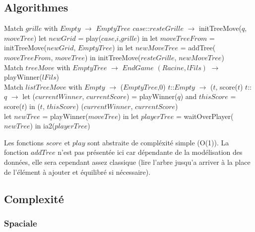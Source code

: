 \documentclass[a4paper,12pt]{report}
\begin{document}
\subsection{Algorithmes}

\begin{algorithmic}
	\State Match $grille$ with
	\State $Empty$ $\rightarrow$ $EmptyTree$
	\State $case$::$resteGrille$ $\rightarrow$
			initTreeMove($q$, $moveTree$)
		\Else
				\State let $newGrid$ = play($case$,$i$,$grille$) in
				\State let $moveTreeFrom$ = initTreeMove($newGrid$, $EmptyTree$) in
				\State let $newMoveTree$ = addTree($moveTreeFrom$, $moveTree$) in
				\State initTreeMove($resteGrille$, $newMoveTree$)
			\EndFor
		\EndIf
\EndFunction
\\
	\State Match $treeMove$ with
	\State $EmptyTree$ $\rightarrow$ $EndGame$
	\State $(Racine, lFils)$ $\rightarrow$ playWinner($lFils$)
\EndFunction
\\
	\State Match $listTreeMove$ with
	\State $Empty$ $\rightarrow$ ($EmptyTree$,0)
	\State $t$::$Empty$ $\rightarrow$ ($t$, score($t$)
	\State $t$::$q$ $\rightarrow$ let ($currentWinner$, $currentScore$) = playWinner($q$) and $thisScore$ = score($t$) in
			\State ($t$, $thisScore$)
		\Else
			\State ($currentWinner$, $currentScore$)
		\EndIf
\EndFunction
\\
	\State let $newTree$ = playWinner($moveTree$) in
	\State let $playerTree$ = waitOverPlayer($newTree$) in
	\State ia2($playerTree$)
\EndFunction
\end{algorithmic}
Les fonctions $score$ et $play$ sont abstraite de compl\'exit\'e simple (O(1)). La fonction $addTree$ n'est pas pr\'esent\'ee ici car d\'ependante de la mod\'elisation des donn\'ees, elle sera cependant assez classique (lire l'arbre jusqu'a arriver \`a la place de l'\'el\'ement \`a ajouter et \'equilibr\'e si n\'ecessaire).

\subsection{Complexit\'e}

\subsubsection{Spaciale}
\end{document}
